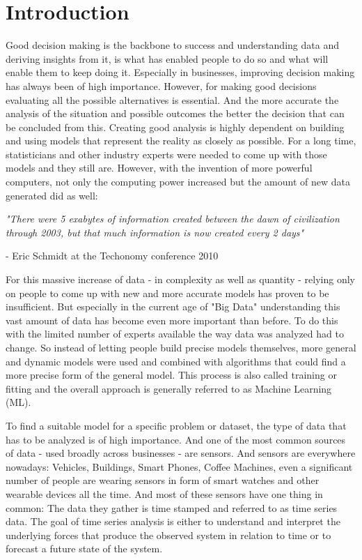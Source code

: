 
\chapter{Introduction}


Good decision making is the backbone to success and understanding data and deriving insights from it, is what has enabled people to do so and what will enable them to keep doing it.
Especially in businesses, improving decision making has always been of high importance.
However, for making good decisions evaluating all the possible alternatives is essential. And the more accurate the analysis of the situation and possible outcomes the better the decision that can be concluded from this. 
Creating good analysis is highly dependent on building and using models that represent the reality as closely as possible. For a long time, statisticians and other industry experts were needed to come up with those models and they still are. However, with the invention of more powerful computers, not only the computing power increased but the amount of new data generated did as well: 
\begin{center}
	\textit{"There were 5 exabytes of information created between the dawn of civilization through 2003, but that much information is now created every 2 days"}\begin{flushright}
		- Eric Schmidt at the Techonomy conference 2010
	\end{flushright} 
\end{center} 
For this massive increase of data - in complexity as well as quantity - relying only on people to come up with new and more accurate models has proven to be insufficient.
But especially in the current age of "Big Data" understanding this vast amount of data has become even more important than before. To do this with the limited number of experts available the way data was analyzed had to change. So instead of letting people build precise models themselves, more general and dynamic models were used and combined with algorithms that could find a more precise form of the general model. This process is also called training or fitting and the overall approach is generally referred to as Machine Learning (\acs{ML}). 

To find a suitable model for a specific problem or dataset, the type of data that has to be analyzed is of high importance. And one of the most common sources of data - used broadly across businesses - are sensors. And sensors are everywhere nowadays: Vehicles, Buildings, Smart Phones, Coffee Machines, even a significant number of people are wearing sensors in form of smart watches and other wearable devices all the time. And most of these sensors have one thing in common: The data they gather is time stamped and referred to as time series data. The goal of time series analysis is either to understand and interpret the underlying forces that produce the observed system in relation to time or to forecast a future state of the system.

